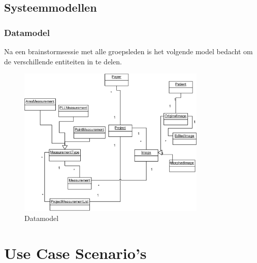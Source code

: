 \subsection{Systeemmodellen}
\subsubsection{Datamodel}
Na een brainstormsessie met alle groepsleden is het volgende model bedacht om de verschillende entiteiten in te delen.
\begin{figure}[htp]
\begin{center}
	\includegraphics[width=0.8\textwidth]{brainstorm_klassediagram}
\caption{Datamodel}
\label{default}
\end{center}
\end{figure}


\section{Use Case Scenario's}

